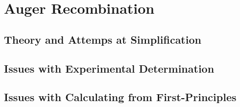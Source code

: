 
\section{Auger Recombination}\label{auger-recombination}

\subsection{Theory and Attemps at
Simplification}\label{theory-and-attemps-at-simplification}

\subsection{Issues with Experimental
Determination}\label{issues-with-experimental-determination}

\subsection{Issues with Calculating from
First-Principles}\label{issues-with-calculating-from-first-principles}
